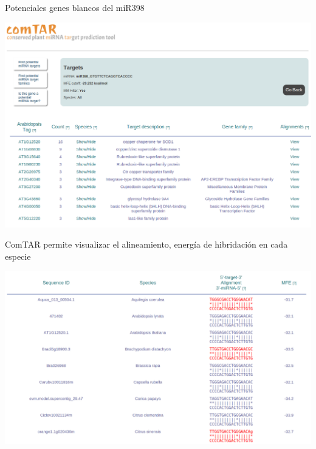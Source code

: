\documentclass{beamer}
\begin{document}
\begin{frame}{Potenciales genes blancos del miR398}
	\begin{center}
		\includegraphics[width=1\textwidth]{img/comTAR_find_targets.png}
	\end{center}
\end{frame}

\begin{frame}{ComTAR permite visualizar el alineamiento, energía de hibridación en cada especie}
	\begin{center}
		\includegraphics[width=1\textwidth]{img/comTAR_fig2.png}
	\end{center}
\end{frame}
\end{document}
